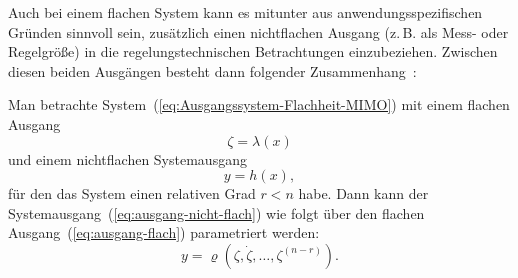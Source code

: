 Auch bei einem flachen System kann es mitunter aus anwendungsspezifischen
Gründen sinnvoll sein, zusätzlich einen nichtflachen Ausgang (z.\,B.
als Mess- oder Regelgröße) in die regelungstechnischen Betrachtungen
einzubeziehen. Zwischen diesen beiden Ausgängen besteht dann folgender
Zusammenhang~\cite{hagenmeyer2004scl}:
\begin{theorem}
Man betrachte System~(\ref{eq:Ausgangssystem-Flachheit-MIMO}) mit
einem flachen Ausgang
\begin{equation}
\zeta=\lambda(x)\label{eq:ausgang-flach}
\end{equation}
und einem nichtflachen Systemausgang
\begin{equation}
y=h(x),\label{eq:ausgang-nicht-flach}
\end{equation}
für den das System einen relativen Grad $r<n$ habe. Dann kann der
System\-ausgang~(\ref{eq:ausgang-nicht-flach}) wie folgt über den
flachen Ausgang~(\ref{eq:ausgang-flach}) parametriert werden:
\begin{equation}
y=\varrho(\zeta,\dot{\zeta},\ldots,\zeta^{(n-r)}).\label{eq:parametrierung-nichtflacher-systemausgang}
\end{equation}
\end{theorem}

